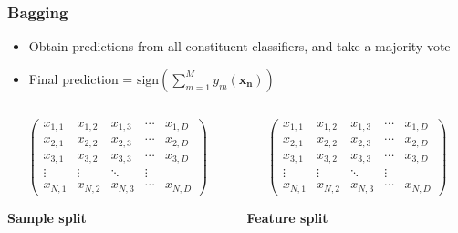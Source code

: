 \documentclass{beamer}
\begin{document}
    \begin{frame}
        \frametitle{Bagging}
        \begin{itemize}
            \item{Obtain predictions from all constituent classifiers, and take a majority vote}
            \item{Final prediction = $\mathrm{sign}(\displaystyle \sum_{m = 1}^M y_m(\mathbf{x_n}))$}
        \end{itemize}
        \begin{columns}
            \begin{column}{0.5\textwidth}
                \[
                \begin{pmatrix}
                    x_{1,1} & x_{1,2} & x_{1, 3} & \cdots & x_{1,D} \\
                    x_{2,1} & x_{2,2} & x_{2, 3} & \cdots & x_{2,D} \\
                    x_{3,1} & x_{3,2} & x_{3, 3} & \cdots & x_{3,D} \\
                    \vdots  & \vdots  & \ddots & \vdots  \\
                    x_{N,1} & x_{N,2} & x_{N, 3} & \cdots & x_{N,D}
                \end{pmatrix}
                \]
                \begin{center}
                    \textbf{Sample split}
                \end{center}
            \end{column}
            \begin{column}{0.5\textwidth}
                \[
                \begin{pmatrix}
                    x_{1,1} & x_{1,2} & x_{1, 3} & \cdots & x_{1,D} \\
                    x_{2,1} & x_{2,2} & x_{2, 3} & \cdots & x_{2,D} \\
                    x_{3,1} & x_{3,2} & x_{3, 3} & \cdots & x_{3,D} \\
                    \vdots  & \vdots  & \ddots & \vdots  \\
                    x_{N,1} & x_{N,2} & x_{N, 3} & \cdots & x_{N,D}
                \end{pmatrix}
                \]
                \begin{center}
                    \textbf{Feature split}
                \end{center}
            \end{column}
        \end{columns}
    \end{frame}
    
\end{document}
